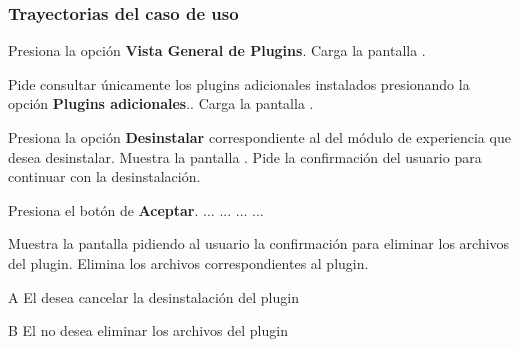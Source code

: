 \subsubsection{Trayectorias del caso de uso}

\begin{UCtrayectoria}%
%
  \Actor Presiona la opción {\bf Vista General de Plugins}.
  \Sistema Carga la pantalla .

  \Actor Pide consultar únicamente los plugins adicionales instalados presionando
         la opción {\bf Plugins adicionales}..
  \Sistema Carga la pantalla .

  \Actor Presiona la opción {\bf Desinstalar} correspondiente al
          del módulo de experiencia que desea desinstalar.
  \Sistema Muestra la pantalla .
  \Sistema Pide la confirmación del usuario para continuar con la desinstalación.

  \Actor Presiona el botón de {\bf Aceptar}. 
  \Sistema ...
  \Sistema ...
  \Sistema ...
  \Sistema ...

  \Sistema Muestra la pantalla  pidiendo al usuario la confirmación
           para eliminar los archivos del plugin. 
  \Sistema Elimina los archivos correspondientes al plugin.

\end{UCtrayectoria}

\begin{UCtrayectoriaA}{A}{%
El  desea cancelar la desinstalación del plugin
}
\end{UCtrayectoriaA}

\begin{UCtrayectoriaA}{B}{%
El  no desea eliminar los archivos del plugin}
\end{UCtrayectoriaA}

